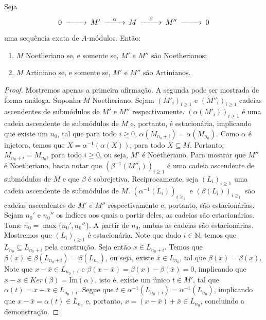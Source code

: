 \begin{proposition}
	\label{loc:6.3_:_relação_da_acc_e_dcc_com_sequências_exatas.proposição}
	Seja
	\begin{equation*}
		\begin{CD}
			0@>{}>>M'@>{\alpha}>>M@>{\beta}>>M''@>{}>>0
		\end{CD}
	\end{equation*}

	uma sequência exata de $A$-módulos. Então:
	\begin{enumerate}
		\item $M$ Noetheriano se, e somente se, $M'$ e $M''$ são Noetherianos;
		\item $M$ Artiniano se, e somente se, $M'$ e $M''$ são Artinianos.
	\end{enumerate}
	\begin{proof}

		Mostremos apenas a primeira afirmação. A segunda pode ser mostrada de forma análoga. Suponha $M$ Noetheriano. Sejam $(M'_{i})_{i\geq1}$ e $(M''_{i})_{i\geq1}$ cadeias ascendentes de submódulos de $M'$ e $M''$ respectivamente.
		$(\alpha(M'_{i}))_{i\geq1}$ é uma cadeia ascendente de submódulos de $M$ e, portanto, é estacionária, implicando que existe um $n_{0}$, tal que para todo $i\geq0$, $\alpha(M_{n_{0}+i})=\alpha(M_{n_{0}})$. Como $\alpha$ é injetora, temos que $X=\alpha ^{-1}(\alpha(X))$, para todo $X \subseteq M$. Portanto, $M_{n_{0}+i}=M_{n_{0}}$, para todo $i\geq0$, ou seja, $M'$ é Noetheriano.
		Para mostrar que $M''$ é Noetheriano, basta notar que $(\beta ^{-1}(M''_{i}))_{i\geq1}$ é uma cadeia ascendente de submódulos de $M$ e que $\beta$ é sobrejetiva.
		Reciprocamente, seja $(L_{i})_{i\geq1}$ uma cadeia ascendente de submódulos de $M$. $(\alpha ^{-1}(L_{i}))_{i\geq_{1}}$ e $(\beta(L_{i}))_{i\geq_{1}}$ são cadeias ascendentes de $M'$ e $M''$ respectivamente e, portanto, são estacionárias.
		Sejam $n_{0}'$ e $n_{0}''$ os índices aos quais a partir deles, as cadeias são estacionárias.
		Tome $n_{0}=\max\{n_{0}', n_{0}''\}$. A partir de $n_{0}$, ambas as cadeias são estacionárias. Mostremos que $(L_{i})_{i\geq 1}$ é estacionária. Note que dado $i \in \mathbb{N}$, temos que $L_{n_{0}}\subseteq L_{n_{0}+i}$ pela construção. Seja então $x \in L_{n_{0}+i}$. Temos que $\beta(x)\in \beta(L_{n_{0}+i})=\beta(L_{n_{0}})$, ou seja, existe $\bar{x}\in L_{n_{0}}$, tal que $\beta(\bar{x})=\beta (x)$. Note que $x-\bar{x}\in L_{n_{0}+i}$ e $\beta(x-\bar{x})=\beta(x)-\beta(\bar{x})=0$, implicando que $x-\bar{x}\in Ker(\beta)=\mathrm{Im}(\alpha)$, isto é, existe um único $t\in M'$, tal que $\alpha(t)=x-\bar{x} \in L_{n_{0}+i}$. Segue que $t \in \alpha ^{-1}(L_{n_{0}+i})=\alpha ^{-1}(L_{n_{0}})$, implicando que $x-\bar{x}=\alpha(t) \in L_{n_{0}}$ e, portanto, $x=(x-\bar{x})+\bar{x}\in L_{n_{0}}$, concluindo a demonstração.
	\end{proof}
\end{proposition}
